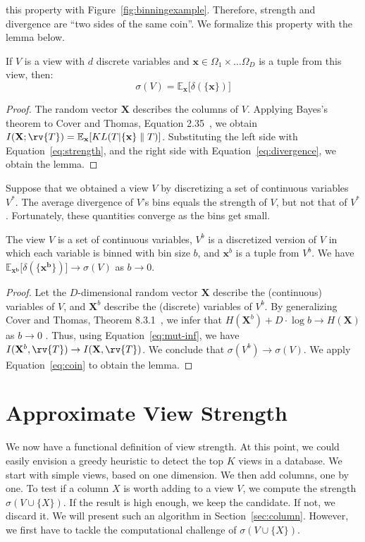 this property with Figure~\ref{fig:binningexample}.  Therefore, strength and
divergence are ``two sides of the same coin''. We formalize this property with
the lemma below.
\begin{lemma}
    If $V$ is a view with $d$ discrete variables and $\mathbf{x} \in \Omega_1
    \times \ldots \Omega_D$ is a tuple from this view, then:
    \begin{equation}\label{eq:coin}
        \sigma(V) = \mathbb{E}_{\mathbf{x}}  \big[ \delta(\{\mathbf{x}\}) \big]
    \end{equation}
\end{lemma}
\begin{proof}
    The random vector $\mathbf{X}$ describes the columns of $V$. Applying
    Bayes's theorem to Cover and Thomas, Equation
    2.35~\cite{cover2012elements}, we obtain $ I(\mathbf{X} ; \rv{T})
    =\mathbb{E}_{\mathbf{x}}[ KL( T | \{\mathbf{x}\} \parallel T )]$.
    Substituting the left side with Equation~\ref{eq:strength}, and the right
    side with Equation~\ref{eq:divergence}, we obtain the lemma.
\end{proof}
Suppose that we obtained a view $V$ by discretizing a set of continuous
variables $V^*$. The average divergence of $V$'s bins equals the strength of $V$,
but not that of $V^*$. Fortunately, these quantities converge as the bins get
small.
\begin{lemma}
    The view $V$ is a set of continuous variables, $V^b$ is a discretized
    version of $V$ in which each variable is binned with bin size $b$, and
    $\mathbf{x}^b$ is a tuple from $V^b$. We have $\mathbb{E}_{\mathbf{x^b}}
    \big[ \delta(\{\mathbf{x^b}\}) \big] \to  \sigma(V)$ as $b \to 0$.
\end{lemma}
\begin{proof}
    Let the $D$-dimensional random vector $\mathbf{X}$ describe the
    (continuous) variables of $V$, and $\mathbf{X}^b$ describe the (discrete)
    variables of $V^b$. By generalizing Cover and Thomas, Theorem
    8.3.1~\cite{cover2012elements}, we infer that $H(\mathbf{X}^b) + D \cdot \log{b}
    \to H(\mathbf{X})$ as $b \to 0$ .  Thus, using Equation~\ref{eq:mut-inf},
    we have $I(\mathbf{X}^b, \rv{T}) \to I(\mathbf{X}, \rv{T})$. We conclude
    that $\sigma(V^b) \to \sigma(V)$. We apply Equation~\ref{eq:coin} to obtain
    the lemma.
\end{proof}


\section{Approximate View Strength}
\label{sec:approximate}
We now have a functional definition of view strength.  At this point, we could
easily envision a greedy heuristic to detect the top $K$ views in a database.
We start with simple views, based on one dimension. We then add columns, one by
one.  To test if a column $X$ is worth adding to a view $V$, we compute the
strength $\sigma(V \cup \{X\})$. If the result is high enough, we keep the
candidate. If not, we discard it. We will present such an algorithm in
Section~\ref{sec:column}. However, we first have to tackle the computational challenge of $\sigma(V \cup \{X\})$.

